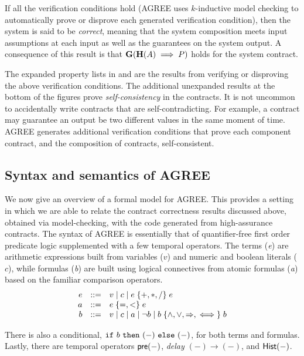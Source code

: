 If all the verification conditions hold (AGREE uses $k$-inductive
model checking to automatically prove or disprove each generated
verification condition), then the system is said to be \emph{correct},
meaning that the system composition meets input assumptions at each
input as well as the guarantees on the system output. A consequence of
this result is that $\mathbf{G}(\mathbf{H}(A) \implies
P)$ holds for the system contract.

The expanded property lists in  and
 are the results from verifying or
disproving the above verification conditions.  The additional
unexpanded results at the bottom of the figures prove
\emph{self-consistency} in the contracts.  It is not uncommon to
accidentally write contracts that are self-contradicting.  For
example, a contract may guarantee an output be two different values in
the same moment of time.  AGREE generates additional verification
conditions that prove each component contract, and the composition of
contracts, self-consistent.

\subsection{Syntax and semantics of AGREE}
\label{agree-semantics}

We now give an overview of a formal model for AGREE. This provides a
setting in which we are able to relate the contract correctness
results discussed above, obtained via model-checking, with the code
generated from high-assurance contracts.  The syntax of AGREE is
essentially that of quantifier-free first order predicate logic
supplemented with a few temporal operators. The terms (\emph{e}) are
arithmetic expressions built from variables ($v$) and numeric and
boolean literals ($c$), while formulas (\emph{b}) are built using
logical connectives from atomic formulas (\emph{a}) based on the
familiar comparison operators.
\[
\begin{array}{rcl}
e & ::= & v \mid c \mid e \;\{ {+,*,/} \}\; e \\
a & ::= & e\; \{ {=,<} \}\; e \\
b & ::= & v \mid c \mid a \mid \neg b
            \mid b \; \{ {\land,\lor,\Rightarrow,\iff} \}\; b
\end{array}
\]

There is also a conditional, $\mbox{$\mathtt{if}\ {b}\ \mathtt{then}\ {(-)}\ \mathtt{else}\ {(-)}$}$, for both terms
and formulas. Lastly, there are temporal operators $\mathsf{pre}(-)$,
\emph{delay} $(-) \to (-)$, and $\mathsf{Hist}(-)$.

